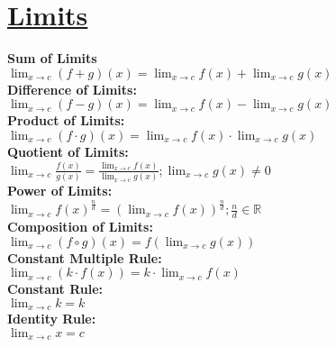 \documentclass[12pt]{article}
\begin{document}
\section*{\underline{\textbf{Limits}}}
\textbf{Sum of Limits}
    \\ \( \displaystyle\lim_{x \rightarrow{c}} {(f + g)(x)} = \displaystyle\lim_{x \rightarrow{c}} {f(x)} + \displaystyle\lim_{x \rightarrow{c}} {g(x)} \)
\\ \textbf{Difference of Limits:}
    \\ \( \displaystyle\lim_{x \rightarrow{c}} {(f - g)(x)} = \displaystyle\lim_{x \rightarrow{c}} {f(x)} - \displaystyle\lim_{x \rightarrow{c}} {g(x)} \)
\\ \textbf{Product of Limits:}   
    \\ \( \displaystyle\lim_{x \rightarrow{c}} {(f \cdot g)(x)} = \displaystyle\lim_{x \rightarrow{c}} {f(x)} \cdot \displaystyle\lim_{x \rightarrow{c}} {g(x)} \)
\\ \textbf{Quotient of Limits:}
    \\ \( \displaystyle\lim_{x \rightarrow{c}} {\displaystyle\frac{ f(x) }{ g(x) }} = \displaystyle\frac{ \displaystyle\lim_{x \rightarrow{c}} {f(x)} }{ \displaystyle\lim_{x \rightarrow{c}} {g(x)} } ; \displaystyle\lim_{x \rightarrow{c}} {g(x)} \ne 0 \)
\\ \textbf{Power of Limits:}
    \\ \( \displaystyle\lim_{x \rightarrow{c}} {f(x)^{\frac{ n }{ d }}} = (\displaystyle\lim_{x \rightarrow{c}} {f(x)})^{\frac{ n }{ d }} ; \displaystyle\frac{ n }{ d } \in \mathbb{R} \)
\\ \textbf{Composition of Limits:}
    \\ \( \displaystyle\lim_{x \rightarrow{c}} {(f \circ g)(x)} = f(\displaystyle\lim_{x \rightarrow{c}} {g(x)}) \)
\\ \textbf{Constant Multiple Rule:}
    \\ \( \displaystyle\lim_{x \rightarrow{c}} {(k \cdot f(x))} = k \cdot \displaystyle\lim_{x \rightarrow{c}} {f(x)} \)
\\ \textbf{Constant Rule:}
    \\ \( \displaystyle\lim_{x \rightarrow{c}} {k} = k \)
\\ \textbf{Identity Rule:}
    \\ \( \displaystyle\lim_{x \rightarrow{c}} {x} = c \)
\end{document}
